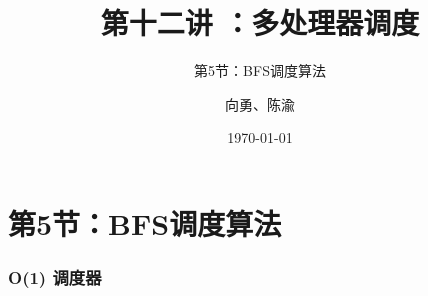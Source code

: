 


\title[第1讲]{第十二讲 ：多处理器调度} %
\subtitle{第5节：BFS调度算法}
\author{向勇、陈渝} %
\date{\today} %




\begin{frame}
\titlepage %
\end{frame}

%
%
\section{第5节：BFS调度算法} %

\begin{frame}
	\frametitle{ O(1) 调度器}
\end{frame}

